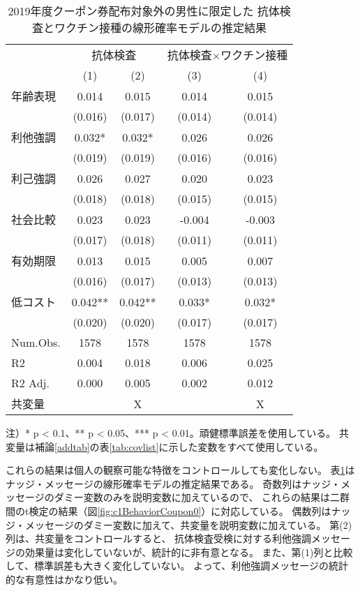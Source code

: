 \documentclass[
  11pt,
  a4paper,
]{article}
\begin{document}
\begin{table}

\caption{\label{tab:c1RegCoupon0}2019年度クーポン券配布対象外の男性に限定した 抗体検査とワクチン接種の線形確率モデルの推定結果}
\centering
\fontsize{9}{11}\selectfont
\begin{threeparttable}
\begin{tabular}[t]{lcccc}
\toprule
\multicolumn{1}{c}{ } & \multicolumn{2}{c}{抗体検査} & \multicolumn{2}{c}{抗体検査×ワクチン接種} \\
\cmidrule(l{3pt}r{3pt}){2-3} \cmidrule(l{3pt}r{3pt}){4-5}
  & (1) & (2) & (3) & (4)\\
\midrule
年齢表現 & 0.014 & 0.015 & 0.014 & 0.015\\
 & (0.016) & (0.017) & (0.014) & (0.014)\\
利他強調 & 0.032* & 0.032* & 0.026 & 0.026\\
 & (0.019) & (0.019) & (0.016) & (0.016)\\
利己強調 & 0.026 & 0.027 & 0.020 & 0.023\\
 & (0.018) & (0.018) & (0.015) & (0.015)\\
社会比較 & 0.023 & 0.023 & -0.004 & -0.003\\
 & (0.017) & (0.018) & (0.011) & (0.011)\\
有効期限 & 0.013 & 0.015 & 0.005 & 0.007\\
 & (0.016) & (0.017) & (0.013) & (0.013)\\
低コスト & 0.042** & 0.042** & 0.033* & 0.032*\\
 & (0.020) & (0.020) & (0.017) & (0.017)\\
\midrule
Num.Obs. & 1578 & 1578 & 1578 & 1578\\
R2 & 0.004 & 0.018 & 0.006 & 0.025\\
R2 Adj. & 0.000 & 0.005 & 0.002 & 0.012\\
共変量 &  & X &  & X\\
\bottomrule
\end{tabular}
\begin{tablenotes}
\item 注）* p < 0.1、** p < 0.05、*** p < 0.01。頑健標準誤差を使用している。 共変量は補論\ref{addtab}の表\ref{tab:covlist}に示した変数をすべて使用している。
\end{tablenotes}
\end{threeparttable}
\end{table}

これらの結果は個人の観察可能な特徴をコントロールしても変化しない。
表\ref{tab:c1RegCoupon0}はナッジ・メッセージの線形確率モデルの推定結果である。
奇数列はナッジ・メッセージのダミー変数のみを説明変数に加えているので、
これらの結果は二群間のt検定の結果（図\ref{fig:c1BehaviorCoupon0}）に対応している。
偶数列はナッジ・メッセージのダミー変数に加えて、共変量を説明変数に加えている。
第(2)列は、共変量をコントロールすると、
抗体検査受検に対する利他強調メッセージの効果量は変化していないが、統計的に非有意となる。
また、第(1)列と比較して、標準誤差も大きく変化していない。
よって、利他強調メッセージの統計的な有意性はかなり低い。
\end{document}
